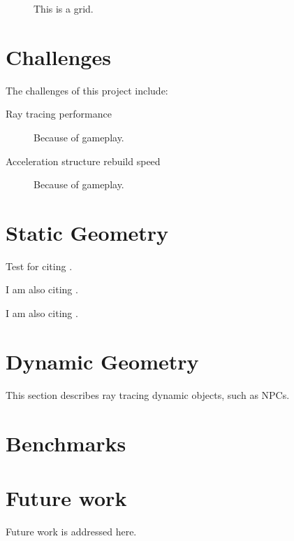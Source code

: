 \documentclass[]{article}
\begin{document}
\begin{figure}
  \centering
  \caption{This is a grid.}
\end{figure}

\section{Challenges}
The challenges of this project include:
\begin{description}
  \item [Ray tracing performance] Because of gameplay.
  \item [Acceleration structure rebuild speed] Because of gameplay.
\end{description}

\section{Static Geometry}
Test for citing \cite{amanatides1987fast}.

I am also citing \cite{ivson2009gpu}.

I am also citing \cite{reinhard2000dynamic}.

\section{Dynamic Geometry}
This section describes ray tracing dynamic objects, such as NPCs.

\section{Benchmarks}


\section{Future work}
Future work is addressed here.

{}

\end{document}
